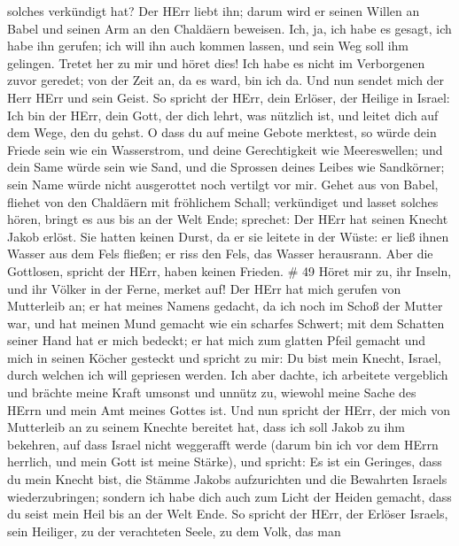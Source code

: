 solches verkündigt hat? Der HErr liebt ihn; darum wird er seinen Willen
an Babel und seinen Arm an den Chaldäern beweisen.  Ich,
ja, ich habe es gesagt, ich habe ihn gerufen; ich will ihn auch kommen
lassen, und sein Weg soll ihm gelingen.  Tretet her zu mir
und höret dies! Ich habe es nicht im Verborgenen zuvor geredet; von der
Zeit an, da es ward, bin ich da. Und nun sendet mich der Herr HErr und
sein Geist.  So spricht der HErr, dein Erlöser, der Heilige
in Israel: Ich bin der HErr, dein Gott, der dich lehrt, was nützlich
ist, und leitet dich auf dem Wege, den du gehst.  O dass du
auf meine Gebote merktest, so würde dein Friede sein wie ein
Wasserstrom, und deine Gerechtigkeit wie Meereswellen;  und
dein Same würde sein wie Sand, und die Sprossen deines Leibes wie
Sandkörner; sein Name würde nicht ausgerottet noch vertilgt vor mir.
 Gehet aus von Babel, fliehet von den Chaldäern mit
fröhlichem Schall; verkündiget und lasset solches hören, bringt es aus
bis an der Welt Ende; sprechet: Der HErr hat seinen Knecht Jakob erlöst.
 Sie hatten keinen Durst, da er sie leitete in der Wüste:
er ließ ihnen Wasser aus dem Fels fließen; er riss den Fels, das Wasser
herausrann.  Aber die Gottlosen, spricht der HErr, haben
keinen Frieden. \# 49  Höret mir zu, ihr Inseln, und ihr
Völker in der Ferne, merket auf! Der HErr hat mich gerufen von
Mutterleib an; er hat meines Namens gedacht, da ich noch im Schoß der
Mutter war,  und hat meinen Mund gemacht wie ein scharfes
Schwert; mit dem Schatten seiner Hand hat er mich bedeckt; er hat mich
zum glatten Pfeil gemacht und mich in seinen Köcher gesteckt
 und spricht zu mir: Du bist mein Knecht, Israel, durch
welchen ich will gepriesen werden.  Ich aber dachte, ich
arbeitete vergeblich und brächte meine Kraft umsonst und unnütz zu,
wiewohl meine Sache des HErrn und mein Amt meines Gottes ist.
 Und nun spricht der HErr, der mich von Mutterleib an zu
seinem Knechte bereitet hat, dass ich soll Jakob zu ihm bekehren, auf
dass Israel nicht weggerafft werde (darum bin ich vor dem HErrn
herrlich, und mein Gott ist meine Stärke),  und spricht: Es
ist ein Geringes, dass du mein Knecht bist, die Stämme Jakobs
aufzurichten und die Bewahrten Israels wiederzubringen; sondern ich habe
dich auch zum Licht der Heiden gemacht, dass du seist mein Heil bis an
der Welt Ende.  So spricht der HErr, der Erlöser Israels,
sein Heiliger, zu der verachteten Seele, zu dem Volk, das man
